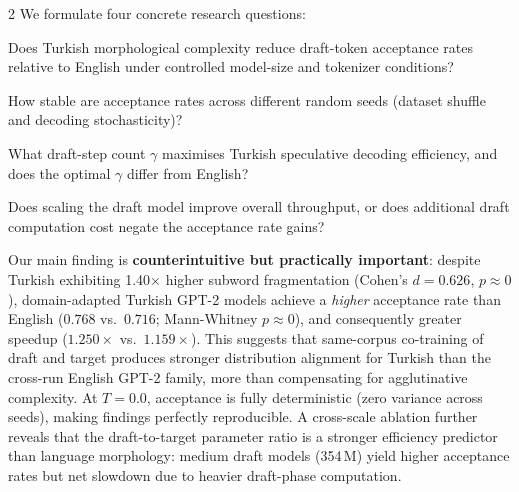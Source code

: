 \documentclass[11pt,a4paper]{article}
\begin{document}
\begin{multicols}{2}
We formulate four concrete research questions:

\begin{description}[leftmargin=0pt, labelwidth=0pt, itemsep=2pt]
  \item[\textbf{RQ1}] Does Turkish morphological complexity reduce
        draft-token acceptance rates relative to English under controlled
        model-size and tokenizer conditions?
  \item[\textbf{RQ2}] How stable are acceptance rates across different
        random seeds (dataset shuffle and decoding stochasticity)?
  \item[\textbf{RQ3}] What draft-step count $\gamma$ maximises Turkish
        speculative decoding efficiency, and does the optimal $\gamma$
        differ from English?
  \item[\textbf{RQ4}] Does scaling the draft model improve overall
        throughput, or does additional draft computation cost negate the
        acceptance rate gains?
\end{description}

Our main finding is \textbf{counterintuitive but practically important}:
despite Turkish exhibiting 1.40$\times$ higher subword fragmentation
(Cohen's $d = 0.626$, $p \approx 0$), domain-adapted Turkish GPT-2 models
achieve a \emph{higher} acceptance rate than English ($0.768$ vs.\ $0.716$;
Mann-Whitney $p \approx 0$), and consequently greater speedup
($1.250\!\times$ vs.\ $1.159\!\times$).
This suggests that same-corpus co-training of draft and target produces
stronger distribution alignment for Turkish than the cross-run English
GPT-2 family, more than compensating for agglutinative complexity.
At $T=0.0$, acceptance is fully deterministic (zero variance across seeds),
making findings perfectly reproducible.
A cross-scale ablation further reveals that the draft-to-target parameter
ratio is a stronger efficiency predictor than language morphology: medium
draft models (354\,M) yield higher acceptance rates but net slowdown
due to heavier draft-phase computation.


\end{multicols}
\end{document}
